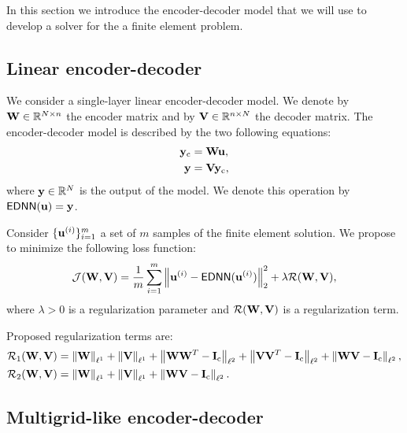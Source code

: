 In this section we introduce the encoder-decoder model that we will use to develop a solver for the a finite element problem.

\subsection{Linear encoder-decoder}

We consider a single-layer linear encoder-decoder model.
We denote by \(\mathbf{W} \in \mathbb{R}^{N \times n}\) the encoder matrix and by \(\mathbf{V} \in \mathbb{R}^{n \times N}\) the decoder matrix.
The encoder-decoder model is described by the two following equations:
\begin{subequations}
    \begin{align}
        \mathbf{y}_\mathrm{c} & = \mathbf{W} \mathbf{u}, \\
        \mathbf{y} & = \mathbf{V} \mathbf{y}_\mathrm{c},
    \end{align}
\end{subequations}
where \(\mathbf{y} \in \mathbb{R}^{N}\) is the output of the model.
We denote this operation by \(\mathsf{EDNN}(\mathbf{u}) = \mathbf{y}\).

Consider \( \{ \mathbf{u}^{(i)} \}_{i=1}^{m} \) a set of \(m\) samples of the finite element solution.
We propose to minimize the following loss function:
\begin{equation}
    \mathcal{J}(\mathbf{W}, \mathbf{V}) =
    \frac{1}{m} \sum_{i=1}^{m} \left\| \mathbf{u}^{(i)} - \mathsf{EDNN}(\mathbf{u}^{(i)}) \right\|_2^2 +
    \lambda \mathcal{R}(\mathbf{W}, \mathbf{V}),
\end{equation}
where \(\lambda > 0\) is a regularization parameter and \(\mathcal{R}(\mathbf{W}, \mathbf{V})\) is a regularization term.

Proposed regularization terms are:
\begin{subequations}
    \label{eq:regularization}
    \begin{align}
        \mathcal{R}_1(\mathbf{W}, \mathbf{V}) &
        = \left\lVert \mathbf{W}  \right\rVert_{\ell^1} + \left\lVert \mathbf{V}  \right\rVert_{\ell^1}
        + \left\lVert \mathbf{W} \mathbf{W}^T - \mathbf{I}_\mathrm{c}  \right\rVert_{\ell^2} + \left\lVert \mathbf{V} \mathbf{V}^T - \mathbf{I}_\mathrm{c}  \right\rVert_{\ell^2}
        + \left\lVert \mathbf{W} \mathbf{V} - \mathbf{I}_\mathrm{c}  \right\rVert_{\ell^2}, \\
        \mathcal{R}_2(\mathbf{W}, \mathbf{V}) &
        = \left\lVert \mathbf{W}  \right\rVert_{\ell^1} + \left\lVert \mathbf{V}  \right\rVert_{\ell^1}
        + \left\lVert \mathbf{W} \mathbf{V} - \mathbf{I}_\mathrm{c}  \right\rVert_{\ell^2}.
    \end{align}
\end{subequations}

\subsection{Multigrid-like encoder-decoder}

